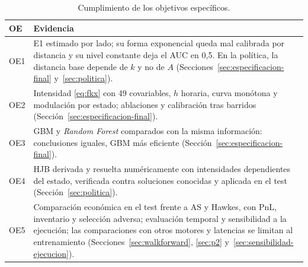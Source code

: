 \begin{table}[H]
\centering\small
\caption[Evidencia por objetivo específico.]{Cumplimiento de los objetivos específicos.}
\label{tab:avance-oe}
\begin{tabular}{@{}p{}p{}@{}}\toprule
OE & Evidencia\\\midrule
OE1 & E1 estimado por lado; su forma exponencial queda mal calibrada por distancia y su nivel constante deja el AUC en 0,5. En la política, la distancia base depende de $k$ y no de $A$ (Secciones~\ref{sec:especificacion-final} y~\ref{sec:politica}).\\
OE2 & Intensidad \eqref{eq:fkx} con 49 covariables, $h$ horaria, curva monótona y modulación por estado; ablaciones y calibración tras barridos (Sección~\ref{sec:especificacion-final}).\\
OE3 & GBM y \textit{Random Forest} comparados con la misma información: conclusiones iguales, GBM más eficiente (Sección~\ref{sec:especificacion-final}).\\
OE4 & HJB derivada y resuelta numéricamente con intensidades dependientes del estado, verificada contra soluciones conocidas y aplicada en el test (Sección~\ref{sec:politica}).\\
OE5 & Comparación económica en el test frente a AS y Hawkes, con PnL, inventario y selección adversa; evaluación temporal y sensibilidad a la ejecución; las comparaciones con otros motores y latencias se limitan al entrenamiento (Secciones~\ref{sec:walkforward}, \ref{sec:p2} y~\ref{sec:sensibilidad-ejecucion}).\\\bottomrule
\end{tabular}
\end{table}